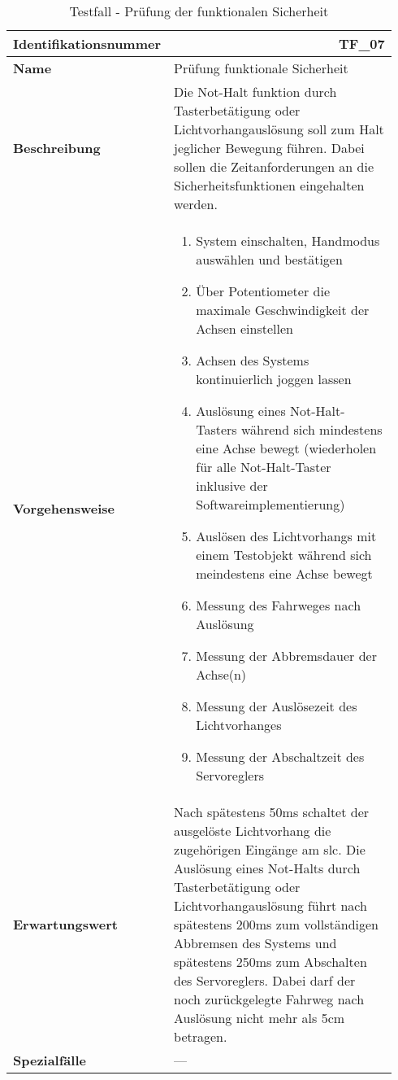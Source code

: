 \documentclass[../../../Bachelorarbeit.tex]{subfiles}
\begin{document}
\begin{table}[H]
    \centering
    \begin{tabular}{ p{0.34\linewidth}  p{0.6\linewidth} }
        \hline
        \textbf{Identifikationsnummer}  & \multicolumn{1}{r}{TF\_07} \\ \hline
        \textbf{Name}                   & Prüfung funktionale Sicherheit \\
        \textbf{Beschreibung}           & Die Not-Halt funktion durch Tasterbetätigung oder Lichtvorhangauslösung soll zum Halt jeglicher Bewegung führen. Dabei sollen die Zeitanforderungen an die Sicherheitsfunktionen eingehalten werden. \\
        \textbf{Vorgehensweise}         &   {\begin{enumerate}[noitemsep,topsep=0pt,parsep=0pt,partopsep=0pt,leftmargin=*]
                                                \item System einschalten, Handmodus auswählen und bestätigen
                                                \item Über Potentiometer die maximale Geschwindigkeit der Achsen einstellen
                                                \item Achsen des Systems kontinuierlich joggen lassen
                                                \item Auslösung eines Not-Halt-Tasters während sich mindestens eine Achse bewegt (wiederholen für alle Not-Halt-Taster inklusive der Softwareimplementierung)
                                                \item Auslösen des Lichtvorhangs mit einem Testobjekt während sich meindestens eine Achse bewegt
                                                \item Messung des Fahrweges nach Auslösung
                                                \item Messung der Abbremsdauer der Achse(n)
                                                \item Messung der Auslösezeit des Lichtvorhanges
                                                \item Messung der Abschaltzeit des Servoreglers
                                            \end{enumerate}} \\
        \textbf{Erwartungswert}         & Nach spätestens 50\si{ms} schaltet der ausgelöste Lichtvorhang die zugehörigen Eingänge am \acs{slc}. Die Auslösung eines Not-Halts durch Tasterbetätigung oder Lichtvorhangauslösung führt nach spätestens 200\si{ms} zum vollständigen Abbremsen des Systems und spätestens 250\si{ms} zum Abschalten des Servoreglers. Dabei darf der noch zurückgelegte Fahrweg nach Auslösung nicht mehr als 5cm betragen. \\
        \textbf{Spezialfälle}           & --- \\ \hline
    \end{tabular}
    \caption[\acs{tf} - Funktionale Sicherheit]{Testfall - Prüfung der funktionalen Sicherheit}
    \label{tab:my-table67}
\end{table}
\end{document}
